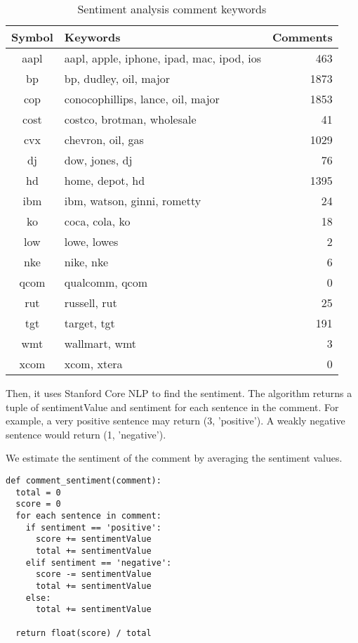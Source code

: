 \documentclass[twocolumn,10pt]{asme2ej}
\begin{document}
\begin{table}
  \begin{tabular}{clr}
    Symbol & Keywords & Comments \\
    \hline
    aapl & aapl, apple, iphone, ipad, mac, ipod, ios & 463 \\
    bp & bp, dudley, oil, major & 1873 \\
    cop & conocophillips, lance, oil, major & 1853 \\
    cost & costco, brotman, wholesale & 41 \\
    cvx & chevron, oil, gas & 1029 \\
    dj & dow, jones, dj & 76 \\
    hd & home, depot, hd & 1395 \\
    ibm & ibm, watson, ginni, rometty & 24 \\
    ko & coca, cola, ko & 18 \\
    low & lowe, lowes & 2 \\
    nke & nike, nke & 6 \\
    qcom & qualcomm, qcom & 0 \\
    rut & russell, rut & 25 \\
    tgt & target, tgt & 191 \\
    wmt & wallmart, wmt & 3 \\
    xcom & xcom, xtera & 0 \\
  \end{tabular}
  \caption{Sentiment analysis comment keywords}
  \label{sentiment_keywords}
\end{table}


Then, it uses Stanford Core NLP \cite{manning-EtAl:2014:P14-5} to find
the sentiment. The algorithm returns a tuple of sentimentValue and
sentiment for each sentence in the comment. For example, a very
positive sentence may return (3, 'positive'). A weakly negative
sentence would return (1, 'negative').

We estimate the sentiment of the comment by averaging the sentiment
values.

\begin{verbatim}
def comment_sentiment(comment):
  total = 0
  score = 0
  for each sentence in comment:
    if sentiment == 'positive':
      score += sentimentValue
      total += sentimentValue
    elif sentiment == 'negative':
      score -= sentimentValue
      total += sentimentValue
    else:
      total += sentimentValue

  return float(score) / total
\end{verbatim}
\end{document}
